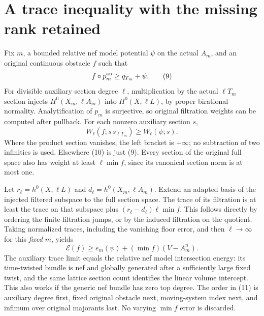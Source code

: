 \documentclass[10pt]{article}
\begin{document}
\section{A trace inequality with the missing rank retained}
Fix $m$, a bounded relative nef model potential $\psi$ on the actual
$A_m$, and an original continuous obstacle $f$ such that
\[
                    f\circ p_m^{\rm an}\geq q_{T_m}+\psi.          \tag{9}
\]
For divisible auxiliary section degree $\ell$, multiplication by
the actual $\ell T_m$ section injects
$H^0(X_m,\ell A_m)$ into $H^0(X,\ell L)$, by proper birational
normality. Analytification of $p_m$ is surjective, so original
filtration weights can be computed after pullback. For each nonzero
auxiliary section $s$,
\[
 W_\ell(f;s\,s_{\ell T_m})\geq W_\ell(\psi;s).          \tag{10}
\]
Where the product section vanishes, the left bracket is $+\infty$;
no subtraction of two infinities is used. Elsewhere (10) is just (9).
Every section of the original full space also has weight at least
$\ell\min f$, since its canonical section norm is at most one.

Let $r_\ell=h^0(X,\ell L)$ and $d_\ell=h^0(X_m,\ell A_m)$.
Extend an adapted basis of the injected filtered subspace to the
full section space. The trace of its filtration is at least the trace
on that subspace plus $(r_\ell-d_\ell)\ell\min f$.
This follows directly by ordering the finite filtration jumps, or
by the induced filtration on the quotient. Taking normalized traces,
including the vanishing floor error, and then $\ell\to\infty$ for
this \emph{fixed} $m$, yields
\[
 \mathscr E(f)\geq e_m(\psi)+(\min f)(V-A_m^n).           \tag{11}
\]
The auxiliary trace limit equals the relative nef model intersection
energy: its time-twisted bundle is nef and globally generated after
a sufficiently large fixed twist, and the same lattice section count
identifies the linear volume intercept. This also works if the
generic nef bundle has zero top degree.
The order in (11) is auxiliary degree first, fixed original obstacle
next, moving-system index next, and infimum over original majorants
last. No varying $\min f$ error is discarded.
\end{document}
